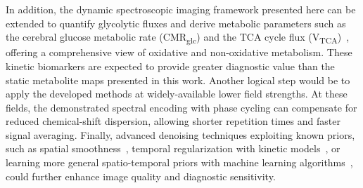 In addition, the dynamic spectroscopic imaging framework presented here can be extended to quantify glycolytic fluxes and derive metabolic parameters such as the cerebral glucose metabolic rate (CMR\textsubscript{glc}) and the \gls{TCA} cycle flux (V\textsubscript{TCA})~\cite{luQuantitativeAssessmentBrain2017,kreisMeasuringTumorGlycolytic2020}, offering a comprehensive view of oxidative and non-oxidative metabolism. These kinetic biomarkers are expected to provide greater diagnostic value than the static metabolite maps presented in this work. Another logical step would be to apply the developed methods at widely-available lower field strengths. At these fields, the demonstrated spectral encoding with phase cycling can compensate for reduced chemical-shift dispersion, allowing shorter repetition times and faster signal averaging. Finally, advanced denoising techniques exploiting known priors, such as spatial smoothness~\cite{dabovImageDenoisingSparse2007}, temporal regularization with kinetic models~\cite{montraziDeuteriumImagingWarburg2023}, or learning more general spatio-temporal priors with machine learning algorithms~\cite{osburgPhysicsInformedDeepAutoencoder2025}, could further enhance image quality and diagnostic sensitivity. 


